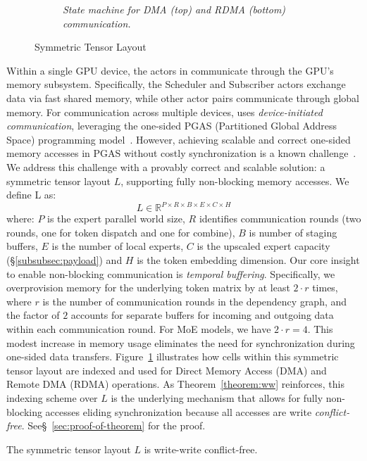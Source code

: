 \begin{figure}[!ht]
\begin{subfigure}{0.325\textwidth}
        \caption{\emph{State machine for DMA (top) and RDMA (bottom) communication.}}
        \label{fig:sm}
    \end{subfigure}\caption{Symmetric Tensor Layout}
    \label{fig:symmt}
\end{figure}

Within a single GPU device, the actors in \sysname communicate through the GPU's memory subsystem.
Specifically, the Scheduler and Subscriber actors exchange data via fast shared memory, while other actor pairs
communicate through global memory.
For communication across multiple devices, \sysname uses \emph{device-initiated communication},
leveraging the one-sided PGAS (Partitioned Global Address Space) programming model~\cite{10.1145/1278177.1278183}.
However, achieving scalable and correct one-sided memory accesses in PGAS without costly synchronization
is a known challenge~\cite{deepep, triton-dist}.
We address this challenge with a provably correct and scalable solution: a symmetric tensor layout $L$,
supporting fully non-blocking memory accesses.
We define L as:\\
\[
    L \in \mathbb{R}^{P\times R \times B \times E \times C \times H}
\]
where: $P$ is the expert parallel world size, $R$ identifies communication rounds (\ie two rounds,
one for token dispatch and one for combine), $B$ is number of staging buffers,
$E$ is the number of local experts, $C$ is the upscaled expert capacity (\S\ref{subsubsec:payload})
and $H$ is the token embedding dimension.
Our core insight to enable non-blocking communication is \emph{temporal buffering}.
Specifically, we overprovision memory for the underlying token matrix by at least $2 \cdot r$ times, where $r$
is the number of communication rounds in the dependency graph, and the factor of $2$ accounts for
separate buffers for incoming and outgoing data within each communication round.
For MoE models, we have $2 \cdot r = 4$.
This modest increase in memory usage eliminates the need for synchronization during one-sided data transfers.
Figure~\ref{fig:sm} illustrates how cells within this symmetric tensor layout are indexed
and used for Direct Memory Access (DMA) and Remote DMA (RDMA) operations.
As Theorem~\ref{theorem:ww} reinforces,
this indexing scheme over $L$ is the underlying mechanism that allows for fully non-blocking accesses eliding
synchronization because all accesses are write \emph{conflict-free}.
See\S~\ref{sec:proof-of-theorem} for the proof.
\begin{theorem}\label{theorem:ww}
   The symmetric tensor layout $L$ is write-write conflict-free.
\end{theorem}
